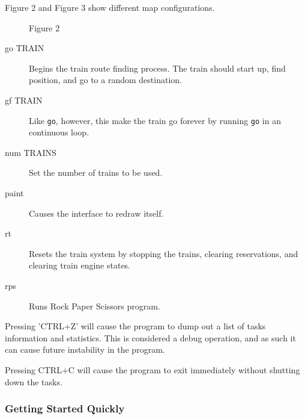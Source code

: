 \documentclass[letterpaper]{article}
\begin{document}
Figure 2 and Figure 3 show different map configurations.
\begin{figure}
\noindent{}
\caption{Figure 2}
\end{figure}
%
\begin{description}
\item[{go TRAIN}] \leavevmode 
Begins the train route finding process. The train should start up, find position, and go to a random destination.

\item[{gf TRAIN}] \leavevmode 
Like \texttt{go}, however, this make the train go forever by running \texttt{go} in an continuous loop.

\item[{num TRAINS}] \leavevmode 
Set the number of trains to be used.

\item[{paint}] \leavevmode 
Causes the interface to redraw itself.

\item[{rt}] \leavevmode 
Resets the train system by stopping the trains, clearing reservations, and clearing train engine states.

\item[{rps}] \leavevmode 
Runs Rock Paper Scissors program.

\end{description}

Pressing 'CTRL+Z' will cause the program to dump out a list of tasks information and statistics.   This is considered a debug operation, and as such it can cause future instability in the program.

Pressing CTRL+C will cause the program to exit immediately without shutting down the tasks.


\subsubsection{Getting Started Quickly%
  \label{getting-started-quickly}%
}
\end{document}
